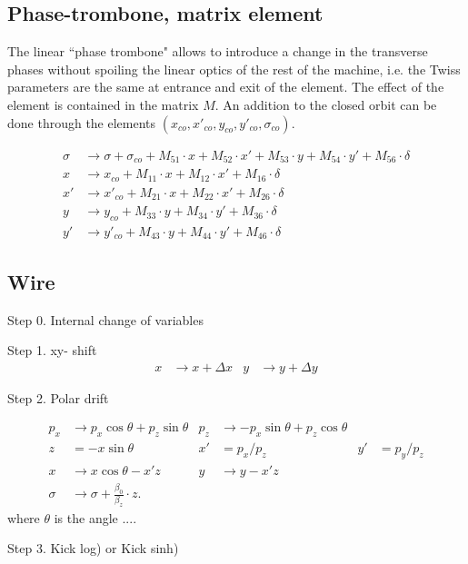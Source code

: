 \documentclass[english]{article}
\begin{document}
\subsection{Phase-trombone, matrix element}
The linear ``phase trombone" allows to introduce a change in the transverse phases 
without spoiling the linear optics of the rest of the machine, i.e. the Twiss 
parameters are the same at entrance and exit of the element. The effect of the element 
is contained in the matrix $M$. An addition to the closed orbit can be done through the
elements $(x_{co},x'_{co},y_{co},y'_{co},\sigma_{co})$.

\begin{align}
    \sigma & \to \sigma + \sigma_{co} + M_{51}\cdot x + M_{52}\cdot x' 
    + M_{53}\cdot y + M_{54}\cdot y' + M_{56}\cdot\delta \\
    x & \to x_{co} + M_{11}\cdot x + M_{12}\cdot x' + M_{16}\cdot\delta \\
    x' & \to x'_{co} + M_{21}\cdot x + M_{22}\cdot x' + M_{26}\cdot\delta \\
    y & \to y_{co} + M_{33}\cdot y + M_{34}\cdot y' + M_{36}\cdot\delta \\
    y' & \to y'_{co} + M_{43}\cdot y + M_{44}\cdot y' + M_{46}\cdot\delta
\end{align}

\subsection{Wire}

 Step 0. Internal change of variables

 Step 1. xy- shift
  \begin{align}
    x & \to x + \Delta x  &
    y & \to y + \Delta y
  \end{align}
 
 Step 2. Polar drift
 
 \begin{align}
p_x & \to   p_x \cos \theta + p_z \sin\theta &
p_z & \to - p_x \sin \theta + p_z \cos\theta \\
z   &= -x \sin \theta & x' &= p_x/p_z &  y' &= p_y/p_z \\
x   & \to x \cos\theta - x' z  &
y   & \to y - x' z  \\
\sigma & \to \sigma + \frac{\beta_0}{\beta_z}  \cdot z.
\end{align}
where $\theta$ is the angle ....
 
 Step 3. Kick log) or Kick sinh)
 
\end{document}
